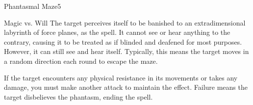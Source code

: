 \begin{spellsection}{Phantasmal Maze}{5}
\begin{spellheader}
\end{spellheader}
\begin{spellcontent}
    \begin{spelltargetinginfo}
    \end{spelltargetinginfo}
    \begin{spelleffects}
        \begin{spellattack}{Magic vs. Will}
            \spellsuccess The target perceives itself to be banished to an extradimensional labyrinth of force planes, as the  spell. It cannot see or hear anything to the contrary, causing it to be treated as if blinded and deafened for most purposes. However, it can still see and hear itself. Typically, this means the target moves in a random direction each round to escape the maze.

            If the target encounters any physical resistance in its movements or takes any damage, you must make another attack to maintain the effect. Failure means the target disbelieves the phantasm, ending the spell.
        \end{spellattack}
        \spelldur \durmed
    \end{spelleffects}
\end{spellcontent}
\begin{spellfooter}
\end{spellfooter}
\end{spellsection}

